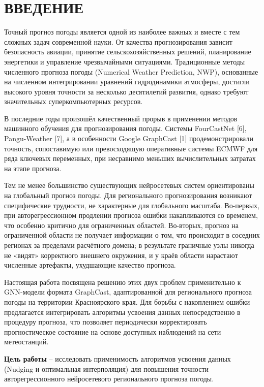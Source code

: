 \documentclass[14pt,a4paper]{extarticle}
\numberwithin{table}{section}
\numberwithin{figure}{section}
\numberwithin{equation}{section}
\begin{document}
{\singlespacing
\tableofcontents
}

\clearpage

\section{ВВЕДЕНИЕ}\label{ux432ux432ux435ux434ux435ux43dux438ux435}

Точный прогноз погоды является одной из наиболее важных и вместе с тем
сложных задач современной науки. От качества прогнозирования зависит
безопасность авиации, принятие сельскохозяйственных решений,
планирование энергетики и управление чрезвычайными ситуациями.
Традиционные методы численного прогноза погоды (Numerical Weather
Prediction, NWP), основанные на численном интегрировании уравнений
гидродинамики атмосферы, достигли высокого уровня точности за несколько
десятилетий развития, однако требуют значительных суперкомпьютерных
ресурсов.

В последние годы произошёл качественный прорыв в применении методов
машинного обучения для прогнозирования погоды. Системы FourCastNet
{[}6{]}, Pangu-Weather {[}7{]}, а в особенности Google GraphCast {[}1{]}
продемонстрировали точность, сопоставимую или превосходящую оперативные
системы ECMWF для ряда ключевых переменных, при несравнимо меньших
вычислительных затратах на этапе прогноза.

Тем не менее большинство существующих нейросетевых систем ориентированы
на глобальный прогноз погоды. Для регионального прогнозирования
возникают специфические трудности, не характерные для глобального
масштаба. Во-первых, при авторегрессионном продлении прогноза ошибки
накапливаются со временем, что особенно критично для ограниченных
областей. Во-вторых, прогноз на ограниченной области не получает
информации о том, что происходит в соседних регионах за пределами
расчётного домена; в результате граничные узлы никогда не «видят»
корректного внешнего окружения, и у краёв области нарастают численные
артефакты, ухудшающие качество прогноза.

Настоящая работа посвящена решению этих двух проблем применительно к
GNN-модели формата GraphCast, адаптированной для регионального прогноза
погоды на территории Красноярского края. Для борьбы с накоплением ошибки
предлагается интегрировать алгоритмы усвоения данных непосредственно в
процедуру прогноза, что позволяет периодически корректировать
прогностическое состояние на основе доступных наблюдений на сети
метеостанций.

\textbf{Цель работы} -- исследовать применимость алгоритмов усвоения
данных (Nudging и оптимальная интерполяция) для повышения точности
авторегрессионного нейросетевого регионального прогноза погоды.
\end{document}
